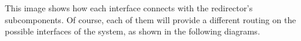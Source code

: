 This image shows how each interface connects with the redirector's subcomponents. Of course, each of them will provide a different routing on the possible interfaces of the system, as shown in the following diagrams.\\
\begin{figure}[H]
	\noindent
\end{figure}
